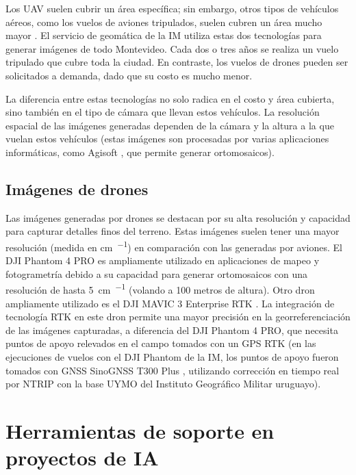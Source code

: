 Los UAV suelen cubrir un área específica; sin embargo, otros tipos de vehículos aéreos, como los vuelos de aviones tripulados, suelen cubren un área mucho mayor \citep{2000_aviation_ortoimagenes_nodate}. El servicio de geomática de la IM utiliza estas dos tecnologías para generar imágenes de todo Montevideo. Cada dos o tres años se realiza un vuelo tripulado que cubre toda la ciudad. En contraste, los vuelos de drones pueden ser solicitados a demanda, dado que su costo es mucho menor.

La diferencia entre estas tecnologías no solo radica en el costo y área cubierta, sino también en el tipo de cámara que llevan estos vehículos. La resolución espacial de las imágenes generadas dependen de la cámara y la altura a la que vuelan estos vehículos (estas imágenes son procesadas por varias aplicaciones informáticas, como Agisoft \citep{agisoft_agisoft_nodate}, que permite generar ortomosaicos).

\subsection{Imágenes de drones}
\label{sec:imgUavDrones}

Las imágenes generadas por drones se destacan por su alta resolución y capacidad para capturar detalles finos del terreno. Estas imágenes suelen tener una mayor resolución (medida en \si{\centi\meter\per\pixel}) en comparación con las generadas por aviones. El DJI Phantom 4 PRO \citep{dji_support_nodate} es ampliamente utilizado en aplicaciones de mapeo y fotogrametría debido a su capacidad para generar ortomosaicos con una resolución de hasta \SI{5}{\centi\meter\per\pixel} (volando a 100 metros de altura). Otro dron ampliamente utilizado es el DJI MAVIC 3 Enterprise RTK \citep{dji_specs_nodate}. La integración de tecnología RTK \citep{wikipedia_rtk_2024} en este dron permite una mayor precisión en la georreferenciación de las imágenes capturadas, a diferencia del DJI Phantom 4 PRO, que necesita puntos de apoyo relevados en el campo tomados con un GPS RTK (en las ejecuciones de vuelos con el DJI Phantom de la IM, los puntos de apoyo fueron tomados con GNSS SinoGNSS T300 Plus \citep{comnav_technology_ltd_receptor_nodate}, utilizando corrección en tiempo real por NTRIP \citep{wikipedia_networked_2025} con la base UYMO del Instituto Geográfico Militar uruguayo).

\section{Herramientas de soporte en proyectos de IA}
\label{sec:herramSopIA}

